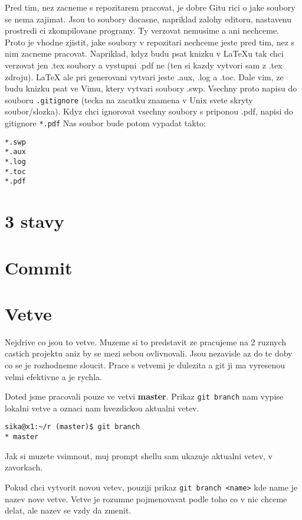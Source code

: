\documentclass[12pt,a5paper]{article}
\begin{document}
Pred tim, nez zacneme s repozitarem pracovat, je dobre Gitu rici o jake soubory se nema zajimat. Jsou to soubory docasne, napriklad zalohy editoru, nastavenu prostredi ci zkompilovane programy. Ty verzovat nemusime a ani nechceme. Proto je vhodne zjistit, jake soubory v repozitari nechceme jeste pred tim, nez s nim zacneme pracovat. Napriklad, kdyz budu psat knizku v LaTeXu tak chci verzovat jen .tex soubory a vystupni .pdf ne (ten si kazdy vytvori sam z .tex zdroju). LaTeX ale pri generovani vytvari jeste .aux, .log a .toc. Dale vim, ze budu knizku psat ve Vimu, ktery vytvari soubory .swp. Vsechny proto napisu do souboru \lstinline|.gitignore| (tecka na zacatku znamena v Unix svete skryty soubor/slozka). Kdyz chci ignorovat vsechny soubory s priponou .pdf, napisi do gitignore \lstinline|*.pdf| Nas soubor bude potom vypadat takto:

\begin{lstlisting}
*.swp
*.aux
*.log
*.toc
*.pdf

\end{lstlisting}


\section{3 stavy}
\section{Commit}
\section{Vetve}

Nejdrive co jsou to vetve. Muzeme si to predstavit ze pracujeme na 2 ruznych castich projektu aniz by se mezi sebou ovlivnovali. Jsou nezavisle az do te doby co se je rozhodneme sloucit. Prace s vetvemi je dulezita a git ji ma vyresenou velmi efektivne a je rychla.

Doted jsme pracovali pouze ve vetvi {\bf master}. Prikaz \lstinline|git branch| nam vypise lokalni vetve a oznaci nam hvezdickou aktualni vetev.

\begin{lstlisting}
sika@x1:~/r (master)$ git branch
* master
\end{lstlisting}

Jak si muzete vsimnout, muj prompt shellu sam ukazuje aktualni vetev, v zavorkach.

Pokud chci vytvorit novou vetev, pouziji prikaz \lstinline|git branch <name>| kde name je nazev nove vetve. Vetve je rozumne pojmenovavat podle toho co v nic chceme delat, ale nazev se vzdy da zmenit.
\end{document}
